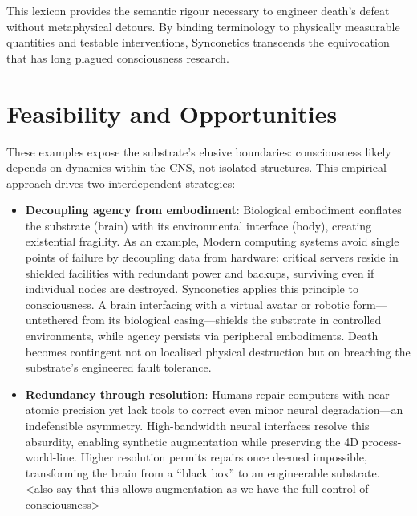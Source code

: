 \documentclass[10pt]{article}
\begin{document}
\begin{sloppypar}
  This lexicon provides the semantic rigour necessary to engineer death’s defeat without metaphysical detours. By binding terminology to physically measurable quantities and testable interventions, Synconetics transcends the equivocation that has long plagued consciousness research.


  \section{Feasibility and Opportunities}
  \label{sec:feasibility}


  These examples expose the substrate’s elusive boundaries: consciousness likely depends on dynamics within the CNS, not isolated structures. This empirical approach drives two interdependent strategies:

  \begin{itemize}
    \item \textbf{Decoupling agency from embodiment}: Biological embodiment conflates the substrate (brain) with its environmental interface (body), creating existential fragility. As an example, Modern computing systems avoid single points of failure by decoupling data from hardware: critical servers reside in shielded facilities with redundant power and backups, surviving even if individual nodes are destroyed. Synconetics applies this principle to consciousness. A brain interfacing with a virtual avatar or robotic form—untethered from its biological casing—shields the substrate in controlled environments, while agency persists via peripheral embodiments. Death becomes contingent not on localised physical destruction but on breaching the substrate’s engineered fault tolerance.
    \item \textbf{Redundancy through resolution}: Humans repair computers with near-atomic precision yet lack tools to correct even minor neural degradation—an indefensible asymmetry. High-bandwidth neural interfaces resolve this absurdity, enabling synthetic augmentation while preserving the 4D process-world-line. Higher resolution permits repairs once deemed impossible, transforming the brain from a “black box” to an engineerable substrate. <also say that this allows augmentation as we have the full control of consciousness>
  \end{itemize}


\end{sloppypar}
\end{document}
